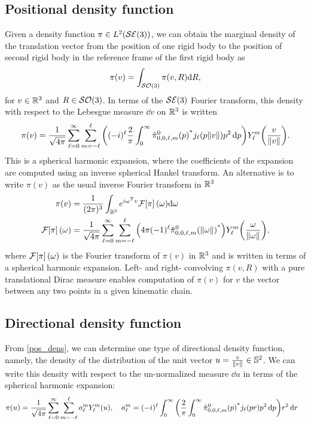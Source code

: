 \documentclass[../../main.tex]{subfiles}
\begin{document}
\begin{refsection}
	\subsection{Positional density function}

	Given a density function $\pi \in L^2(\mathcal{SE} (3))$, we can obtain the marginal density of the translation vector from the position of one rigid body to the position of second rigid body in the reference frame of the first rigid body as $$\pi(v) = \int_{\mathcal{SO} (3)} \pi(v, R) \dd R,$$
	for $v \in \mathbb{R}^3$ and $R \in \mathcal{SO} (3)$.
	In terms of the $\mathcal{SE} (3)$ Fourier transform, this density with respect to the Lebesgue measure $\dd v$ on $\mathbb{R}^3$ is written
	\begin{equation} \label{pos_dens}
		\pi(v) = \frac{1}{\sqrt{4\pi}} \sum_{\ell=0}^\infty \sum_{m=-\ell}^{\ell} \qty((-i)^{\ell} \frac{2}{\pi} \int_{0}^\infty {\hat{\pi}^0_{0,0,\ell,m}(p)}^* j_{\ell} (p \norm{v}) p^2 \dd{p}) Y^{m}_{\ell} \qty( \frac{v}{\norm{v}} ).
	\end{equation}
	This is a spherical harmonic expansion, where the coefficients of the expansion are computed using an inverse spherical Hankel transform.
	An alternative is to write $\pi(v)$ as the usual inverse Fourier transform in $\mathbb{R}^3$
	\begin{align}
		\pi(v)               & = \frac{1}{(2\pi)^3} \int_{\mathbb{R}^3} e^{i {\omega}^\mathrm{T} v} \mathcal{F}\qty[\pi](\omega) \dd \omega                                                                                                 \\
		\mathcal{F}\qty[\pi](\omega) & = \frac{1}{\sqrt{4 \pi}} \sum_{\ell=0}^\infty \sum_{m=-\ell}^{\ell} \qty(4 \pi (-1)^{\ell} {\hat{\pi}^0_{0,0,\ell,m}(\norm{\omega})}^*) Y^{m}_{\ell}\qty(\frac{\omega}{\norm{\omega}}),
	\end{align}
	where $\mathcal{F}\qty[\pi](\omega)$ is the Fourier transform of $\pi(v)$ in $\mathbb{R}^3$ and is written in terms of a spherical harmonic expansion.
	Left- and right- convolving $\pi(v, R)$ with a pure translational Dirac measure enables computation of $\pi(v)$ for $v$ the vector between any two points in a given kinematic chain.

	\subsection{Directional density function}

	From \cref{pos_dens}, we can determine one type of directional density function, namely, the density of the distribution of the unit vector $u = \frac{v}{\norm{v}} \in \mathbb{S}^2$.
	We can write this density with respect to the un-normalized measure $\dd u$ in terms of the spherical harmonic expansion:
	\begin{align*}
		\pi(u)
		 & = \frac{1}{\sqrt{4 \pi}} \sum_{\ell=0}^\infty \sum_{m=-\ell}^{\ell} a^{m}_\ell Y^{m}_{\ell}(u), \quad a^m_\ell = (-i)^{\ell} \int_{0}^\infty \qty( \frac{2}{\pi} \int_{0}^\infty {\hat{\pi}^0_{0,0,\ell,m}(p)}^* j_{\ell} (p r) p^2 \dd{p}) r^2 \dd{r}
	\end{align*}


\end{refsection}
\end{document}
